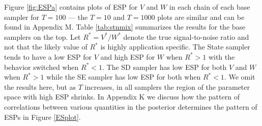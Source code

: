\documentclass[12pt]{article}
\begin{document}
Figure \ref{fig:ESPa} contains plots of ESP for $V$ and $W$ in each chain of each base sampler for $T=100$ --- the $T=10$ and $T=1000$ plots are similar and can be found in Appendix M. Table \ref{tab:stnmix} summarizes the results for the base samplers on the top. Let $R^*=V^*/W^*$ denote the true signal-to-noise ratio and not that the likely value of $R^*$ is highly application specific. The State sampler tends to have a low ESP for $V$ and high ESP for $W$ when $R^*>1$ with the behavior switched when $R^*<1$. The SD sampler has low ESP for both $V$ and $W$ when $R^*>1$ while the SE sampler has low ESP for both when $R^*<1$. We omit the results here, but as $T$ increases, in all samplers the region of the parameter space with high ESP shrinks. In Appendix K we discuss how the pattern of correlations between various quantities in the posterior determines the pattern of ESPs in Figure \ref{ESplot}. 
\end{document}
